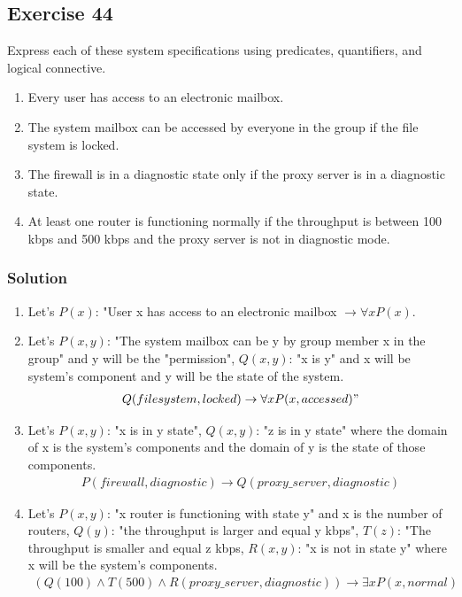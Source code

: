 \documentclass{article}
\begin{document}
\subsection*{Exercise 44}
Express each of these system specifications using predicates, quantifiers, and logical connective.
\begin{enumerate} [label = (\alph*)]
    \item Every user has access to an electronic mailbox.
    \item The system mailbox can be accessed by everyone in the group if the file system is locked.
    \item The firewall is in a diagnostic state only if the proxy server is in a diagnostic state.
    \item At least one router is functioning normally if the throughput is between 100 kbps and 500 kbps and the proxy server is not in diagnostic mode.
\end{enumerate}
\subsubsection*{Solution}
\begin{enumerate} [label = (\alph*)]
    \item Let's $P(x)$: "User x has access to an electronic mailbox $\rightarrow \forall xP(x)$.
    \item Let's $P(x, y)$: "The system mailbox can be y by group member x in the group" and y will be the "permission", $Q(x, y)$: "x is y" and x will be system's component and y will be the state of the system.
          \begin{align}
              Q(file system, locked) \rightarrow \forall xP(x,accessed)"   \nonumber
          \end{align}
    \item Let's $P(x, y)$: "x is in y state", $Q(x, y)$: "z is in y state" where the domain of x is the system's components and the domain of y is the state of those components.
          \begin{align}
              P(firewall, diagnostic) \rightarrow Q(proxy\_server, diagnostic) \nonumber
          \end{align}
    \item Let's $P(x, y)$: "x router is functioning with state y" and x is the number of routers, $Q(y)$: "the throughput is larger and equal y kbps", $T(z)$: "The throughput is smaller and equal z kbps, $R(x, y)$: "x is not in state y" where x will be the system's components.
          \begin{align}
              (Q(100)\land T(500)\land R(proxy\_server, diagnostic)) \rightarrow \exists xP(x, normal)\nonumber
          \end{align}
\end{enumerate}
\end{document}
